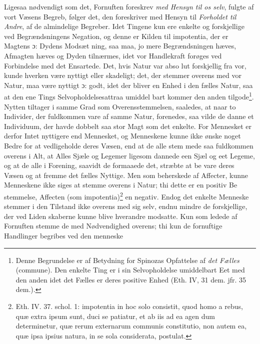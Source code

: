 \documentclass[12pt,a4paper]{book}
\newcommand{\opage}[1]{\marginnote{\footnotesize\textit{[#1]}}}
\begin{document}
\opage{126} \setcounter{footnote}{0}%
Ligesaa nødvendigt som det, Fornuften foreskrev \emph{med
Hensyn til os selv}, fulgte af vort Væsens Begreb, følger
det, den foreskriver med Hensyn til \emph{Forholdet til Andre},
af de almindelige Begreber. Idet Tingene kun ere enkelte
og forskjellige ved Begrændsningens Negation, og denne er
Kilden til impotentia, der er Magtens ɔ: Dydens Modsæt\-%
ning, saa maa, jo mere Begrændsningen hæves, Afmagten
hæves og Dyden tilnærmes, idet vor Handlekraft forøges ved
Forbindelse med det Ensartede. Det, hvis Natur var abso\-%
lut forskjellig fra vor, kunde hverken være nyttigt eller
skadeligt; det, der stemmer overens med vor Natur, maa
være nyttigt ɔ: godt, idet der bliver en Enhed i den fælles
Natur, saa at den ene Tings Selvopholdelsesattraa umiddel\-%
bart kommer den anden tilgode\footnote{Denne Begrundelse er af Betydning for Spinozas Opfattelse af \emph{det
Fælles} (commune). Den enkelte Ting er i sin Selvopholdelse
umiddelbart Eet med den anden idet det Fælles er deres positive
Enhed (Eth. IV, 31 dem. jfr. 35 dem.).}. Nytten tiltager i samme
Grad som Overensstemmelsen, saaledes, at naar to Individer,
der fuldkommen vare af samme Natur, forenedes, saa vilde
de danne et Individuum, der havde dobbelt saa stor Magt
som det enkelte. For Mennesket er derfor Intet nyttigere
end Mennesket, og Menneskene kunne ikke ønske noget
Bedre for at vedligeholde deres Væsen, end at de alle stem\-%
mede saa fuldkommen overens i Alt, at Alles Sjæle og
Legemer ligesom dannede een Sjæl og eet Legeme, og at
de alle i Forening, saavidt de formaaede det, stræbte at be\-%
vare deres Væsen og at fremme det fælles Nyttige. Men
som beherskede af Affecter, kunne Menneskene ikke siges
at stemme overens i Natur; thi dette er en positiv Be\-%
stemmelse, Affecten (som impotentia)\footnote{Eth. IV. 37. schol. 1: impotentia in hoc solo consistit, quod homo a
rebus, quæ extra ipsum sunt, duci se patiatur, et ab iis ad ea agen\-%
dum determinetur, quæ rerum externarum communis constitutio,
non autem ea, quæ ipsa ipsius natura, in se sola considerata,
postulat.} en negativ. Endog
det enkelte Menneske stemmer i den Tilstand ikke overens
\opage{127} \setcounter{footnote}{0}%
med sig selv, endnu mindre de forskjellige, der ved Liden\-%
skaberne kunne blive hverandre modsatte. Kun som ledede
af Fornuften stemme de med Nødvendighed overens; thi
kun de fornuftige Handlinger begribes ved den menneske\-%
\end{document}
